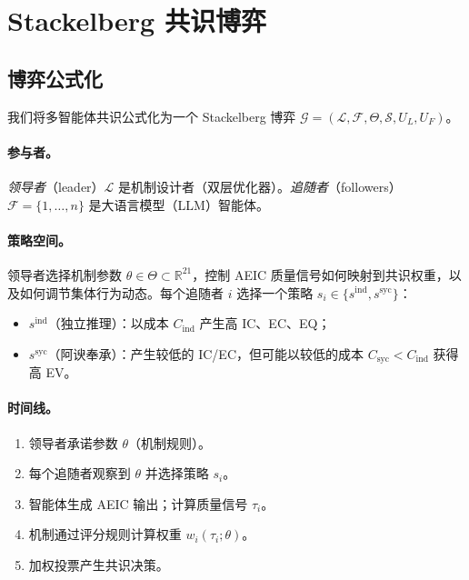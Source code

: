 \section{Stackelberg 共识博弈}
\label{sec:game}

\subsection{博弈公式化}

我们将多智能体共识公式化为一个 Stackelberg 博弈 $\mathcal{G} = (\mathcal{L}, \mathcal{F}, \Theta, \mathcal{S}, U_L, U_F)$。

\paragraph{参与者。} \emph{领导者}（leader）$\mathcal{L}$ 是机制设计者（双层优化器）。\emph{追随者}（followers）$\mathcal{F} = \{1, \ldots, n\}$ 是大语言模型（LLM）智能体。

\paragraph{策略空间。} 领导者选择机制参数 $\theta \in \Theta \subset \mathbb{R}^{21}$，控制 AEIC 质量信号如何映射到共识权重，以及如何调节集体行为动态。每个追随者 $i$ 选择一个策略 $s_i \in \{s^{\text{ind}}, s^{\text{syc}}\}$：
\begin{itemize}
    \item $s^{\text{ind}}$（独立推理）：以成本 $C_{\text{ind}}$ 产生高 IC、EC、EQ；
    \item $s^{\text{syc}}$（阿谀奉承）：产生较低的 IC/EC，但可能以较低的成本 $C_{\text{syc}} < C_{\text{ind}}$ 获得高 EV。
\end{itemize}

\paragraph{时间线。}
\begin{enumerate}
    \item 领导者承诺参数 $\theta$（机制规则）。
    \item 每个追随者观察到 $\theta$ 并选择策略 $s_i$。
    \item 智能体生成 AEIC 输出；计算质量信号 $\tau_i$。
    \item 机制通过评分规则计算权重 $w_i(\tau_i; \theta)$。
    \item 加权投票产生共识决策。
\end{enumerate}

